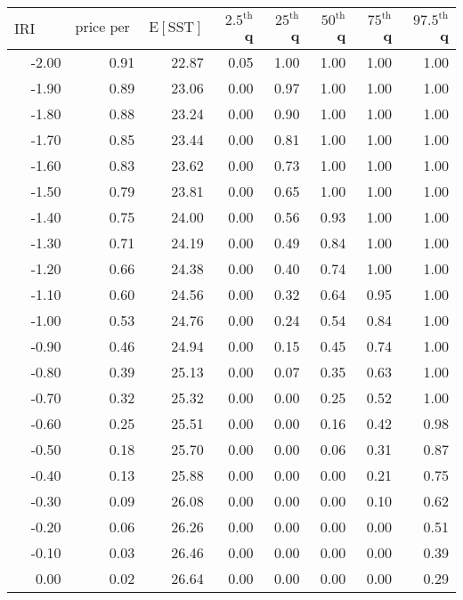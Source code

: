 \begin{table*}[ht]
\centering \footnotesize
\begin{tabular}{rrrrrrrr}
  \hline
$\mbox{IRI anom}$ & $\mbox{price per USD}$ & $\mbox{E}[\mbox{SST}]$ & $2.5^{\mbox{th}}$ q & $25^{\mbox{th}}$ q & $50^{\mbox{th}}$ q & $75^{\mbox{th}}$ q & $97.5^{\mbox{th}}$ q \\ 
  \hline
-2.00 & 0.91 & 22.87 & 0.05 & 1.00 & 1.00 & 1.00 & 1.00 \\ 
  -1.90 & 0.89 & 23.06 & 0.00 & 0.97 & 1.00 & 1.00 & 1.00 \\ 
  -1.80 & 0.88 & 23.24 & 0.00 & 0.90 & 1.00 & 1.00 & 1.00 \\ 
  -1.70 & 0.85 & 23.44 & 0.00 & 0.81 & 1.00 & 1.00 & 1.00 \\ 
  -1.60 & 0.83 & 23.62 & 0.00 & 0.73 & 1.00 & 1.00 & 1.00 \\ 
  -1.50 & 0.79 & 23.81 & 0.00 & 0.65 & 1.00 & 1.00 & 1.00 \\ 
  -1.40 & 0.75 & 24.00 & 0.00 & 0.56 & 0.93 & 1.00 & 1.00 \\ 
  -1.30 & 0.71 & 24.19 & 0.00 & 0.49 & 0.84 & 1.00 & 1.00 \\ 
  -1.20 & 0.66 & 24.38 & 0.00 & 0.40 & 0.74 & 1.00 & 1.00 \\ 
  -1.10 & 0.60 & 24.56 & 0.00 & 0.32 & 0.64 & 0.95 & 1.00 \\ 
  -1.00 & 0.53 & 24.76 & 0.00 & 0.24 & 0.54 & 0.84 & 1.00 \\ 
  -0.90 & 0.46 & 24.94 & 0.00 & 0.15 & 0.45 & 0.74 & 1.00 \\ 
  -0.80 & 0.39 & 25.13 & 0.00 & 0.07 & 0.35 & 0.63 & 1.00 \\ 
  -0.70 & 0.32 & 25.32 & 0.00 & 0.00 & 0.25 & 0.52 & 1.00 \\ 
  -0.60 & 0.25 & 25.51 & 0.00 & 0.00 & 0.16 & 0.42 & 0.98 \\ 
  -0.50 & 0.18 & 25.70 & 0.00 & 0.00 & 0.06 & 0.31 & 0.87 \\ 
  -0.40 & 0.13 & 25.88 & 0.00 & 0.00 & 0.00 & 0.21 & 0.75 \\ 
  -0.30 & 0.09 & 26.08 & 0.00 & 0.00 & 0.00 & 0.10 & 0.62 \\ 
  -0.20 & 0.06 & 26.26 & 0.00 & 0.00 & 0.00 & 0.00 & 0.51 \\ 
  -0.10 & 0.03 & 26.46 & 0.00 & 0.00 & 0.00 & 0.00 & 0.39 \\ 
  0.00 & 0.02 & 26.64 & 0.00 & 0.00 & 0.00 & 0.00 & 0.29 \\ 

\end{tabular}
\end{table*}
